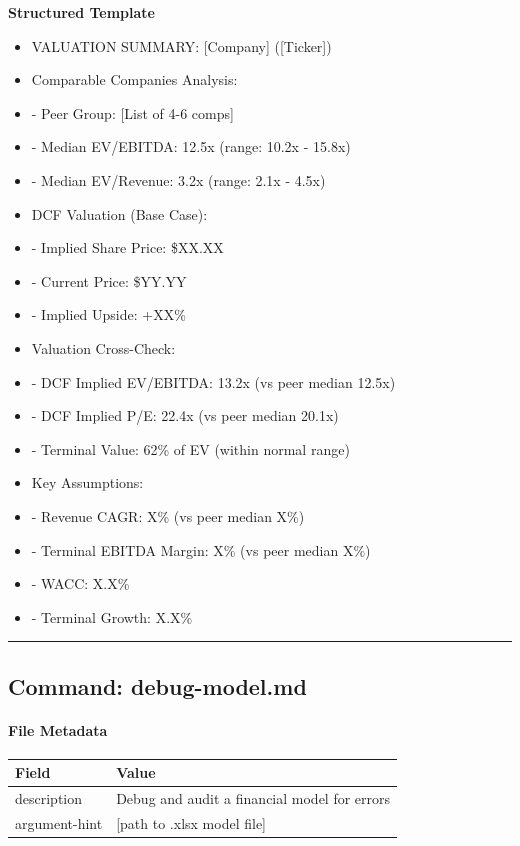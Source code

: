 \documentclass[11pt]{article}
\begin{document}
\textbf{Structured Template}
\begin{itemize}[leftmargin=*,itemsep=2pt,topsep=2pt]
\item {} VALUATION SUMMARY: [Company] ([Ticker])
\item {} Comparable Companies Analysis:
\item {} - Peer Group: [List of 4-6 comps]
\item {} - Median EV/EBITDA: 12.5x (range: 10.2x - 15.8x)
\item {} - Median EV/Revenue: 3.2x (range: 2.1x - 4.5x)
\item {} DCF Valuation (Base Case):
\item {} - Implied Share Price: \$XX.XX
\item {} - Current Price: \$YY.YY
\item {} - Implied Upside: +XX\%
\item {} Valuation Cross-Check:
\item {} - DCF Implied EV/EBITDA: 13.2x (vs peer median 12.5x)
\item {} - DCF Implied P/E: 22.4x (vs peer median 20.1x)
\item {} - Terminal Value: 62\% of EV (within normal range)
\item {} Key Assumptions:
\item {} - Revenue CAGR: X\% (vs peer median X\%)
\item {} - Terminal EBITDA Margin: X\% (vs peer median X\%)
\item {} - WACC: X.X\%
\item {} - Terminal Growth: X.X\%
\end{itemize}

\vspace{0.8em}\hrule\vspace{0.8em}

\subsection{Command: debug-model.md}\label{file:commands-debug-model-md}

\paragraph{File Metadata}\mbox{}\par
\begingroup
\small
\setlength{\tabcolsep}{2pt}
\begin{longtable}{>{\RaggedRight\arraybackslash\hspace{0pt}}p{}>{\RaggedRight\arraybackslash\hspace{0pt}}p{}}
\toprule
{} \textbf{Field} & \textbf{Value} \\
\midrule
{} description & Debug and audit a financial model for errors \\
{} argument-hint & [path to .xlsx model file] \\
\bottomrule
\end{longtable}
\endgroup
\end{document}
